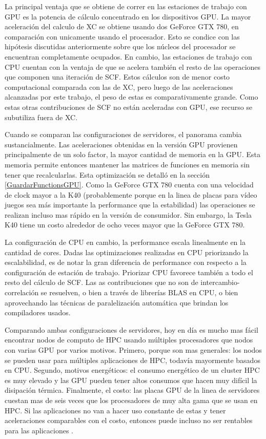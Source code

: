 La principal ventaja que se obtiene de correr en las estaciones de trabajo con GPU es la potencia
de c\'alculo concentrado en los dispositivos GPU. La mayor aceleraci\'on del calculo de XC se obtiene
usando dos GeForce GTX 780, en comparaci\'on con unicamente usando el procesador. Esto se condice con las hip\'otesis discutidas
anteriormente sobre que los n\'ucleos del procesador se encuentran completamente ocupados.
En cambio, las estaciones de trabajo con CPU cuentan con la ventaja de que se acelera tambi\'en el
resto de las operaciones que componen una iteraci\'on de SCF. Estos c\'alculos son de menor costo computacional
comparada con las de XC, pero luego de las aceleraciones alcanzadas por este trabajo, el peso de estas
es comparativamente grande. Como estas otras contribuciones de SCF no est\'an
aceleradas con GPU, ese recurso se subutiliza fuera de XC.

Cuando se comparan las configuraciones de servidores, el panorama cambia sustancialmente.
Las aceleraciones obtenidas en la versi\'on GPU provienen principalmente de un solo factor,
la mayor cantidad de memoria en la GPU. Esta memoria permite entonces mantener las matrices
de funciones en memoria sin tener que recalcularlas. Esta optimizaci\'on se detall\'o en la secci\'on
\ref{GuardarFunctionsGPU}. Como la GeForce GTX 780 cuenta con una velocidad de clock mayor a
la K40 (probablemente porque en la linea de placas para v\'ideo juegos sea m\'as importante
la performance que la estabilidad) las operaciones se realizan incluso mas r\'apido en la
versi\'on de consumidor. Sin embargo, la Tesla K40 tiene un costo alrededor de ocho veces mayor que la
GeForce GTX 780.

La configuraci\'on de CPU en cambio, la performance escala linealmente en la cantidad de cores.
Dadas las optimizaciones realizadas en CPU priorizando la escalabilidad, es de notar la gran
diferencia de performance con respecto a la configuraci\'on de estaci\'on de trabajo. Priorizar CPU
favorece tambi\'en a todo el resto del c\'alculo de SCF. Las as contribuciones que no son
de intercambio-correlaci\'on se resuelven, o bien a trav\'es de librer\'ias BLAS en CPU, o bien
aprovechando las t\'ecnicas de paralelizaci\'on autom\'atica que brindan los compiladores usados.

Comparando ambas configuraciones de servidores, hoy en d\'ia es mucho mas f\'acil encontrar
nodos de computo de HPC usando m\'ultiples procesadores que nodos con varias GPU por varios motivos.
Primero, porque son mas generales: los nodos se pueden usar para m\'ultiples aplicaciones de HPC,
todav\'ia mayormente basados en CPU. Segundo, motivos energ\'eticos: el consumo energ\'etico de un cluster
HPC es muy elevado y las GPU pueden tener altos consumos que hacen muy dif\'icil la disipaci\'on t\'ermica.
Finalmente, el costo: las placas GPU de la linea de servidores cuestan mas de seis veces que los
procesadores de muy alta gama que se usan en HPC. Si las aplicaciones no van a hacer uso constante
de estas y tener aceleraciones comparables con el costo, entonces puede incluso no ser rentables
para las aplicaciones .


